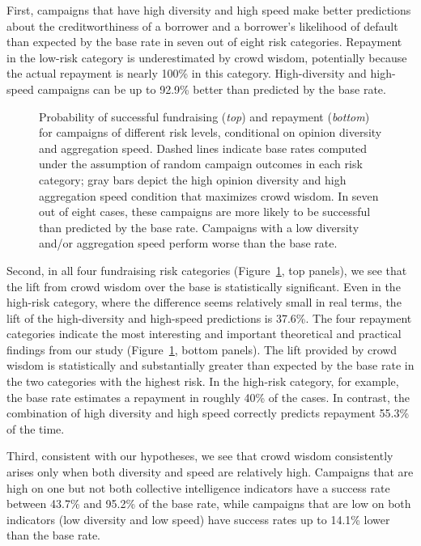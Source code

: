 \documentclass[sigconf]{acmart}
\begin{document}
First, campaigns that have high diversity and high speed make better predictions about the creditworthiness of a borrower and a borrower's likelihood of default than expected by the base rate in seven out of eight risk categories. Repayment in the low-risk category is underestimated by crowd wisdom, potentially because the actual repayment is nearly 100\% in this category. High-diversity and high-speed campaigns can be up to 92.9\% better than predicted by the base rate. 

\begin{figure}
    \centering
    \caption{Probability of successful fundraising (\emph{top}) and repayment (\emph{bottom}) for campaigns of different risk levels, conditional on opinion diversity and aggregation speed. Dashed lines indicate base rates computed under the assumption of random campaign outcomes in each risk category; gray bars depict the high opinion diversity and high aggregation speed condition that maximizes crowd wisdom. In seven out of eight cases, these campaigns are more likely to be successful than predicted by the base rate. Campaigns with a low diversity and/or aggregation speed perform worse than the base rate.}
    \label{fig:estimates}
    \vspace{-2em}
\end{figure}

Second, in all four fundraising risk categories (Figure~\ref{fig:estimates}, top panels), we see that the lift from crowd wisdom over the base is statistically significant. Even in the high-risk category, where the difference seems relatively small in real terms, the lift of the high-diversity and high-speed predictions is 37.6\%. The four repayment categories indicate the most interesting and important theoretical and practical findings from our study (Figure~\ref{fig:estimates}, bottom panels). The lift provided by crowd wisdom is statistically and substantially greater than expected by the base rate in the two categories with the highest risk. In the high-risk category, for example, the base rate estimates a repayment in roughly 40\% of the cases. In contrast, the combination of high diversity and high speed correctly predicts repayment 55.3\% of the time. 

Third, consistent with our hypotheses, we see that crowd wisdom consistently arises only when both diversity and speed are relatively high. Campaigns that are high on one but not both collective intelligence indicators have a success rate between 43.7\% and 95.2\% of the base rate, while campaigns that are low on both indicators (low diversity and low speed) have success rates up to 14.1\% lower than the base rate.
\end{document}
